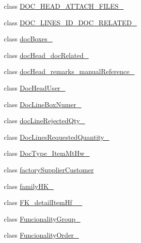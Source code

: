\begin{DoxyCompactItemize}
\item 
class \mbox{\hyperlink{class_h_k_supply_1_1_migrations_1_1_d_o_c___h_e_a_d___a_t_t_a_c_h___f_i_l_e_s__01}{D\+O\+C\+\_\+\+H\+E\+A\+D\+\_\+\+A\+T\+T\+A\+C\+H\+\_\+\+F\+I\+L\+E\+S\+\_}}
\item 
class \mbox{\hyperlink{class_h_k_supply_1_1_migrations_1_1_d_o_c___l_i_n_e_s___i_d___d_o_c___r_e_l_a_t_e_d__01}{D\+O\+C\+\_\+\+L\+I\+N\+E\+S\+\_\+\+I\+D\+\_\+\+D\+O\+C\+\_\+\+R\+E\+L\+A\+T\+E\+D\+\_}}
\item 
class \mbox{\hyperlink{class_h_k_supply_1_1_migrations_1_1doc_boxes__01}{doc\+Boxes\+\_}}
\item 
class \mbox{\hyperlink{class_h_k_supply_1_1_migrations_1_1doc_head__doc_related__01}{doc\+Head\+\_\+doc\+Related\+\_}}
\item 
class \mbox{\hyperlink{class_h_k_supply_1_1_migrations_1_1doc_head__remarks__manual_reference__01}{doc\+Head\+\_\+remarks\+\_\+manual\+Reference\+\_}}
\item 
class \mbox{\hyperlink{class_h_k_supply_1_1_migrations_1_1_doc_head_user__01}{Doc\+Head\+User\+\_}}
\item 
class \mbox{\hyperlink{class_h_k_supply_1_1_migrations_1_1_doc_line_box_numer__01}{Doc\+Line\+Box\+Numer\+\_}}
\item 
class \mbox{\hyperlink{class_h_k_supply_1_1_migrations_1_1doc_line_rejected_qty__01}{doc\+Line\+Rejected\+Qty\+\_}}
\item 
class \mbox{\hyperlink{class_h_k_supply_1_1_migrations_1_1_doc_lines_requested_quantity__01}{Doc\+Lines\+Requested\+Quantity\+\_}}
\item 
class \mbox{\hyperlink{class_h_k_supply_1_1_migrations_1_1_doc_type___item_mt_hw__01}{Doc\+Type\+\_\+\+Item\+Mt\+Hw\+\_}}
\item 
class \mbox{\hyperlink{class_h_k_supply_1_1_migrations_1_1factory_supplier_customer}{factory\+Supplier\+Customer}}
\item 
class \mbox{\hyperlink{class_h_k_supply_1_1_migrations_1_1family_h_k__2}{family\+H\+K\+\_}}
\item 
class \mbox{\hyperlink{class_h_k_supply_1_1_migrations_1_1_f_k__detail_item_hf__20170607__01}{F\+K\+\_\+detail\+Item\+Hf\+\_\+\_}}
\item 
class \mbox{\hyperlink{class_h_k_supply_1_1_migrations_1_1_funcionality_group__01}{Funcionality\+Group\+\_}}
\item 
class \mbox{\hyperlink{class_h_k_supply_1_1_migrations_1_1_funcionality_order__01}{Funcionality\+Order\+\_}}

\end{DoxyCompactItemize}
